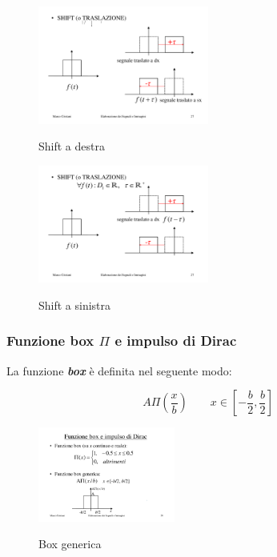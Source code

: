 \documentclass[a4paper]{article}
\begin{document}
	\begin{figure}[!htp]
		\centering
		\includegraphics[width=0.5\textwidth]{img/op_shift_dx.pdf}\label{op_shift_dx}
		\caption{Shift a destra}
		\includegraphics[width=0.5\textwidth]{img/op_shift_sx.pdf}\label{op_shift_sx}
		\caption{Shift a sinistra}
	\end{figure}

	\newpage
	
	\subsubsection{Funzione box $\Pi$ e impulso di Dirac}\label{funzione box e impulso di Dirac}
	
	La funzione \textbf{\emph{box}} è definita nel seguente modo:
	
	\begin{equation*}
		A \Pi\left(\dfrac{x}{b}\right) \hspace{2em} x\in\left[-\dfrac{b}{2}, \dfrac{b}{2}\right]
	\end{equation*}

	\begin{figure}[!htp]
		\centering
		\includegraphics[width=0.4\textwidth]{img/box.pdf}\label{box}
		\caption{Box generica}
	\end{figure}
\end{document}
